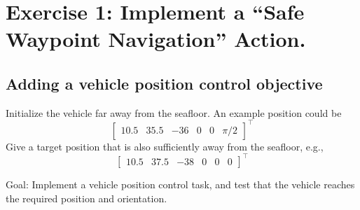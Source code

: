 \documentclass{article}
\begin{document}
\clearpage


\section{Exercise 1: Implement a “Safe Waypoint Navigation” Action.}

\subsection{Adding a vehicle position control objective}
Initialize the vehicle far away from the seafloor. An example position could be
\begin{displaymath}
\begin{bmatrix} 10.5 & 35.5 & -36 & 0 & 0 & \pi/2\end{bmatrix}^\top
\end{displaymath} 
Give a target position that is also sufficiently away from the seafloor, e.g.,
\begin{displaymath}
\begin{bmatrix} 10.5 & 37.5 & -38 & 0 & 0 & 0 \end{bmatrix}^\top
\end{displaymath}

Goal: Implement a vehicle position control task, and test that the vehicle reaches the required position and orientation.
\end{document}

